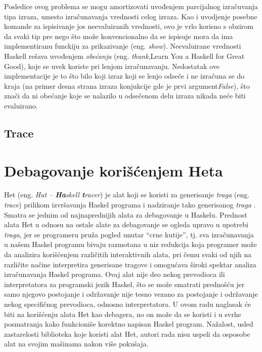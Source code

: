 \documentclass[a4paper]{article}
\begin{document}
Posledice ovog problema se mogu amortizovati uvođenjem parcijalnog izračuvanja tipa izraza, umesto izračunavanja vrednosti celog izraza. Kao i uvodjenje posebne komande za ispisivanje jos neevaluiranih vrednosti, ovo je vrlo korisno s obzirom da svaki tip pre nego što može konvencionalno da se ispisuje mora da ima implementiranu funckiju za prikazivanje (eng. {\em show}). Neevaluirane vrednosti Haskell rešava uvođenjem {\em obećanja} (eng. {\em thunk},Learn You a Haskell for Great Good), koje se uvek koriste pri lenjom izračunavanju. Nedostatak ove implementacije je to što bilo koji izraz koji se lenjo odseče i ne izračuna se do kraja (na primer desna strana izraza konjukcije gde je prvi argument{\em False}), što znači da ni obećanje koje se nalazilo u odsečenom delu izraza nikada neće biti evaluirano. 


\subsection{Trace}


\section{Debagovanje korišćenjem Heta}
Het (eng. {\em Hat -- {\bf \em Ha}skell {\bf \em t}racer}) je alat koji se koristi za generisanje {\em traga} (eng. {\em trace}) prilikom izvršavanja Haskel programa
i nadziranje tako generisanog {\em traga} \cite{chitil2002transforming}. Smatra se jednim od najnaprednijih alata za debagovanje u Haskelu. Prednost alata Het u odnosu na ostale alate za debagovanje 
se ogleda upravo u upotrebi {\em traga}, jer se programeru pruža pogled unutar ``crne kutije'', tj. sva izračunavanja u našem Haskel programu bivaju razmotana u niz redukcija koja programer može da analizira korišćenjem različitih interaktivnih alata, pri čemu svaki od njih na različite načine interpretira generisane tragove i omogućava široki spektar analiza izračunavanja Haskel programa.
Ovaj alat nije deo nekog prevodioca ili interpretatora za programski jezik Haskel,
što se može smatrati prednošću jer samo njegovo postojanje i održavanje nije tesno vezano za postojanje i održavanje nekog specifičnog prevodioca, odnosno interpretatora. 
U ovom radu naglasak će biti na korišćenju alata Het kao debagera, no on može da se koristi i u svrhe posmatranja kako funkcioniše korektno napisan Haskel program.
Nažalost, usled zastarelosti biblioteka koje koristi alat Het, autori rada nisu uspeli da osposobe alat na svojim mašinama nakon više pokušaja. 
\end{document}
